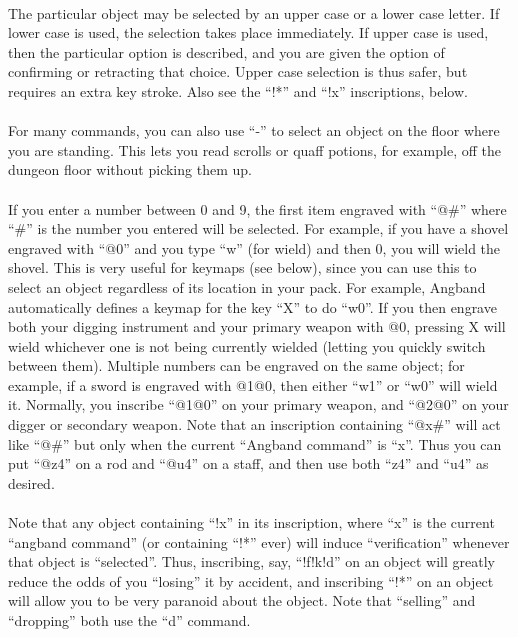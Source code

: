 \paragraph{}The particular object may be selected by an upper case or a lower
case letter. If lower case is used, the selection takes place
immediately. If upper case is used, then the particular option is
described, and you are given the option of confirming or retracting that
choice. Upper case selection is thus safer, but requires an extra key
stroke. Also see the ``!*'' and ``!x'' inscriptions, below.

\paragraph{}For many commands, you can also use ``-'' to select an object on the
floor where you are standing. This lets you read scrolls or quaff
potions, for example, off the dungeon floor without picking them up.

\paragraph{}If you enter a number between 0 and 9, the first item engraved
with ``@\#'' where ``\#'' is the number you entered will be selected. For example,
if you have a shovel engraved with ``@0'' and you type ``w'' (for wield) and
then 0, you will wield the shovel. This is very useful for keymaps (see
below), since you can use this to select an object regardless of its
location in your pack. For example, Angband automatically defines a keymap
for the key ``X'' to do ``w0''. If you then engrave both your digging
instrument and your primary weapon with @0, pressing X will wield
whichever one is not being currently wielded (letting you quickly switch
between them). Multiple numbers can be engraved on the same object; for
example, if a sword is engraved with @1@0, then either ``w1'' or ``w0'' will
wield it. Normally, you inscribe ``@1@0'' on your primary weapon, and
``@2@0'' on your digger or secondary weapon. Note that an inscription
containing ``@x\#'' will act like ``@\#'' but only when the current ``Angband
command'' is ``x''. Thus you can put ``@z4'' on a rod and ``@u4'' on a staff,
and then use both ``z4'' and ``u4'' as desired.

\paragraph{}Note that any object containing ``!x'' in its inscription, where
``x'' is the current ``angband command'' (or containing ``!*'' ever) will induce
``verification'' whenever that object is ``selected''. Thus, inscribing, say,
``!f!k!d'' on an object will greatly reduce the odds of you ``losing'' it by
accident, and inscribing ``!*'' on an object will allow you to be very paranoid
about the object. Note that ``selling'' and ``dropping'' both use the
``d'' command.


